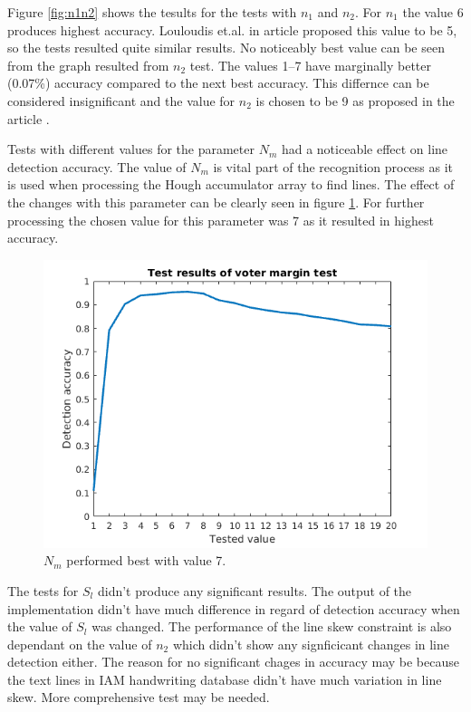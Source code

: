 \documentclass{article}
\begin{document}
    Figure \ref{fig:n1n2} shows the tesults for the tests with $n_1$ and $n_2$. For $n_1$ the value 6 produces highest accuracy. Louloudis et.al. in article \cite{Louloudis2} proposed this value to be 5, so the tests resulted quite similar results. No noticeably best value can be seen from the graph resulted from $n_2$ test. The values 1--7 have marginally better (0.07\%) accuracy compared to the next best accuracy. This differnce can be considered insignificant and the value for $n_2$ is chosen to be 9 as proposed in the article \cite{Louloudis2}.

    Tests with different values for the parameter $N_m$ had a noticeable effect on line detection accuracy. The value of $N_m$ is vital part of the recognition process as it is used when processing the Hough accumulator array to find lines. The effect of the changes with this parameter can be clearly seen in figure \ref{fig:votermargin}. For further processing the chosen value for this parameter was 7 as it resulted in highest accuracy.

    \begin{figure}[!ht]
      \centering
      \includegraphics[natwidth=560,natheight=420,scale=0.45]{votermargin_graph.png}
      \caption{$N_m$ performed best with value 7.
      \label{fig:votermargin}}
    \end{figure}

    The tests for $S_l$ didn't produce any significant results. The output of the implementation didn't have much difference in regard of detection accuracy when the value of $S_l$ was changed. The performance of the line skew constraint is also dependant on the value of $n_2$ which didn't show any signficicant changes in line detection either. The reason for no significant chages in accuracy may be because the text lines in IAM handwriting database didn't have much variation in line skew. More comprehensive test may be needed.
\end{document}
